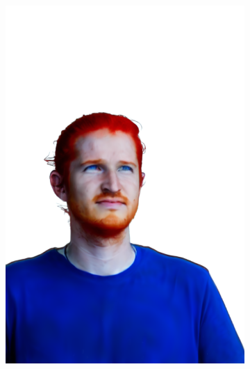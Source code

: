 \begin{figure}[ht]
\begin{subfigure}{0.08\linewidth}
        \includegraphics[width=\textwidth]{Figures/results/high/ephra_red/11_render.png}

\end{subfigure}
\end{figure}
